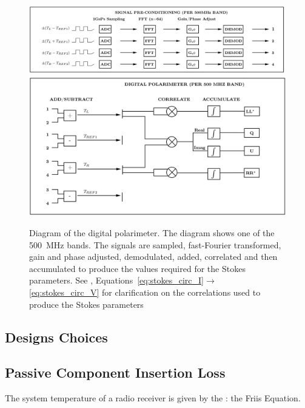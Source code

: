 \begin{figure}[ht]
 \centering
 \includegraphics[width=\textwidth]{images/receiver_schematics/precon.jpg}\\
 \includegraphics[width=\textwidth]{images/receiver_schematics/roach.jpg}
 \caption{Diagram of the digital polarimeter. The diagram shows one of the 500~MHz bands. The signals are sampled, fast-Fourier transformed, gain and phase adjusted, demodulated, added, correlated and then accumulated to produce the values required for the Stokes parameters. See , Equations~\ref{eq:stokes_circ_I}$\rightarrow$\ref{eq:stokes_circ_V} for clarification on the correlations used to produce the Stokes parameters}
 \label{fig:digital_receiver_mine}
\end{figure}
\clearpage


  \subsection{Designs Choices}


\subsection{Passive Component Insertion Loss}

The system temperature of a radio receiver is given by the : the Friis Equation.

